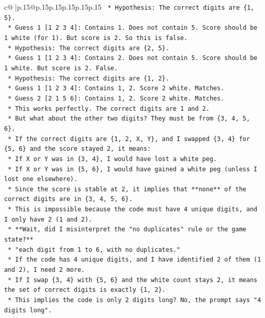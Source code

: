 \documentclass{article}
\begin{document}
{\begin{supertabular}{c@{$\;$}|p{.15\linewidth}@{}p{.15\linewidth}p{.15\linewidth}p{.15\linewidth}p{.15\linewidth}p{.15\linewidth}}
{{{\texttt{    *   Hypothesis: The correct digits are \{1, 5\}.} \\
\texttt{        *   Guess 1 {[}1 2 3 4{]}: Contains 1. Does not contain 5. Score should be 1 white (for 1). But score is 2. So this is false.} \\
\texttt{    *   Hypothesis: The correct digits are \{2, 5\}.} \\
\texttt{        *   Guess 1 {[}1 2 3 4{]}: Contains 2. Does not contain 5. Score should be 1 white. But score is 2. False.} \\
\texttt{    *   Hypothesis: The correct digits are \{1, 2\}.} \\
\texttt{        *   Guess 1 {[}1 2 3 4{]}: Contains 1, 2. Score 2 white. Matches.} \\
\texttt{        *   Guess 2 {[}2 1 5 6{]}: Contains 1, 2. Score 2 white. Matches.} \\
\texttt{        *   This works perfectly. The correct digits are 1 and 2.} \\
\texttt{        *   But what about the other two digits? They must be from \{3, 4, 5, 6\}.} \\
\texttt{        *   If the correct digits are \{1, 2, X, Y\}, and I swapped \{3, 4\} for \{5, 6\} and the score stayed 2, it means:} \\
\texttt{            *   If X or Y was in \{3, 4\}, I would have lost a white peg.} \\
\texttt{            *   If X or Y was in \{5, 6\}, I would have gained a white peg (unless I lost one elsewhere).} \\
\texttt{            *   Since the score is stable at 2, it implies that **none** of the correct digits are in \{3, 4, 5, 6\}.} \\
\texttt{            *   This is impossible because the code must have 4 unique digits, and I only have 2 (1 and 2).} \\
\texttt{    *   **Wait, did I misinterpret the "no duplicates" rule or the game state?**} \\
\texttt{    *   "each digit from 1 to 6, with no duplicates."} \\
\texttt{    *   If the code has 4 unique digits, and I have identified 2 of them (1 and 2), I need 2 more.} \\
\texttt{    *   If I swap \{3, 4\} with \{5, 6\} and the white count stays 2, it means the set of correct digits is exactly \{1, 2\}.} \\
\texttt{    *   This implies the code is only 2 digits long? No, the prompt says "4 digits long".} \\
}}}
\end{supertabular}}
\end{document}
